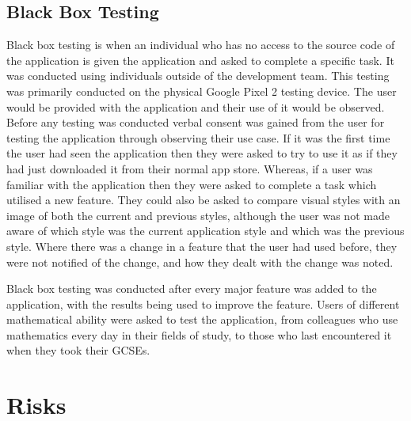 \documentclass{article}
\begin{document}
\subsection{Black Box Testing}

Black box testing is when an individual who has no access to the source code of the application is given the application and asked to complete a specific task. It was conducted using individuals outside of the development team. This testing was primarily conducted on the physical Google Pixel 2 testing device. The user would be provided with the application and their use of it would be observed. Before any testing was conducted verbal consent was gained from the user for testing the application through observing their use case. If it was the first time the user had seen the application then they were asked to try to use it as if they had just downloaded it from their normal app store. Whereas, if a user was familiar with the application then they were asked to complete a task which utilised a new feature. They could also be asked to compare visual styles with an image of both the current and previous styles, although the user was not made aware of which style was the current application style and which was the previous style. Where there was a change in a feature that the user had used before, they were not notified of the change, and how they dealt with the change was noted. \par

Black box testing was conducted after every major feature was added to the application, with the results being used to improve the feature. Users of different mathematical ability were asked to test the application, from colleagues who use mathematics every day in their fields of study, to those who last encountered it when they took their GCSEs. \par

\section{Risks}
\label{section:risks}
\end{document}
